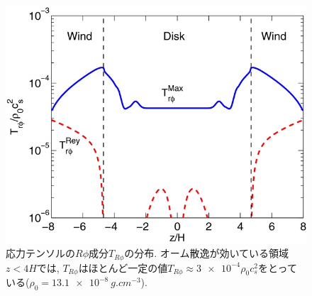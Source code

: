 \documentclass[a4paper,10pt,oneside,twocolumn,notitlepage,final,dvipdfmx]{jarticle}
\begin{document}
\begin{figure}\label{fig:Rphi_stress}
  \centering
  \includegraphics[width=1\linewidth]{./contents/figure8.jpg}
  \caption{応力テンソルの$R\phi$成分$T_{R\phi}$の分布. オーム散逸が効いている領域\( z<4H \)では, $T_{R\phi}$はほとんど一定の値\( T_{R\phi} \approx \num{3e-4}\rho_0 c_s^2 \)をとっている(\( \rho_0 = \SI{13.1e-8}{g.cm^{-3}} \)).}
\end{figure}
\end{document}
